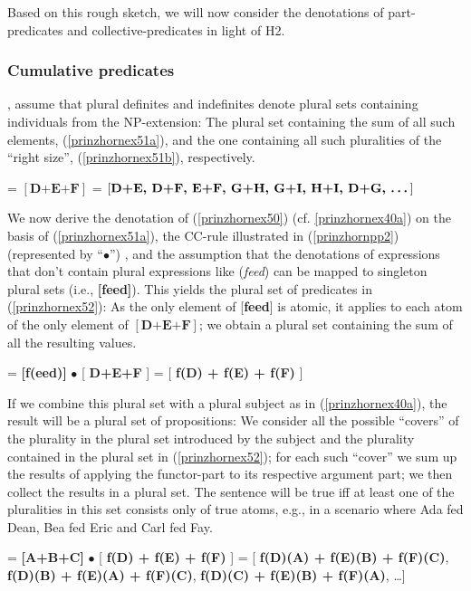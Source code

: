\documentclass[output=paper,colorlinks,citecolor=brown,
]{langscibook}
\begin{document}
Based on this rough sketch, we will now consider the denotations of part-predicates and collective-predicates in light of H2.

\subsubsection{Cumulative predicates}\label{prinzhornsec:cum}  
\citet{Haslinger:2018a, Haslinger:2018b}, assume that plural definites and indefinites denote plural sets containing individuals from the NP-extension: The plural set containing the sum of all such elements, (\ref{prinzhornex51a}), and the one containing all such pluralities of the “right size”, (\ref{prinzhornex51b}), respectively.


\ea 
\ea {} = $[ \textbf{D+E+F} ]$\label{prinzhornex51a}
\ex {} = $[ \textbf{D+E, D+F, E+F, G+H, G+I, H+I, D+G,  \dots} ]$\label{prinzhornex51b}
\z\z

We now derive the denotation of (\ref{prinzhornex50}) (cf. \ref{prinzhornex40a}) on the basis of (\ref{prinzhornex51a}), the CC-rule illustrated in (\ref{prinzhornpp2}) (represented by “$\bullet$”) , and the assumption that the denotations of expressions that don't contain plural expressions like (\textit{feed}) can be mapped to singleton plural sets (i.e., \textbf{[feed]}). This yields the plural set of predicates in (\ref{prinzhornex52}): As the only element of [\textbf{feed}] is atomic, it applies to each atom of the only element of  $[ \textbf{D+E+F} ]$; we obtain a plural set containing the sum of all the resulting values. 

\ea {} = \textbf{[f(eed)]} $\bullet$ [ \textbf{D+E+F} ] =  [ \textbf{f(D) + f(E) + f(F)} ]\label{prinzhornex52}
\z

If we combine this plural set with a plural subject as in (\ref{prinzhornex40a}), the result will be a plural set of propositions: We consider all the possible “covers” of the plurality in the plural set introduced by the subject and the plurality contained in the plural set in (\ref{prinzhornex52}); for each such “cover” we sum up the results of applying the functor-part to its respective argument part; we then collect the results in a plural set. The sentence will be true iff at least one of the pluralities in this set consists only of true atoms, e.g., in a scenario where Ada fed Dean, Bea fed Eric and Carl fed Fay.

\ea {} = \textbf{[A+B+C]} $\bullet$  [ \textbf{f(D) + f(E) + f(F)} ] =  [ \textbf{f(D)(A) + f(E)(B) + f(F)(C)}, \textbf{f(D)(B) + f(E)(A) + f(F)(C)},  \textbf{f(D)(C) + f(E)(B) + f(F)(A)}, \dots ]
\label{prinzhornex53}
\z
\end{document}
